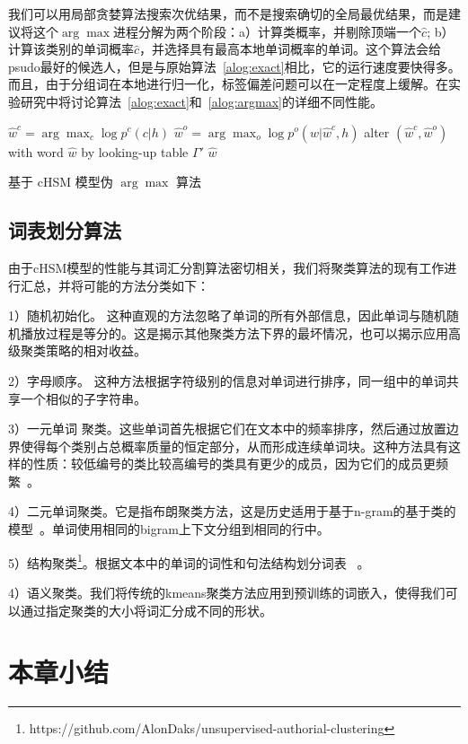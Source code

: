 我们可以用局部贪婪算法搜索次优结果，而不是搜索确切的全局最优结果，而是建议将这个$ \arg\max $进程分解为两个阶段：a）计算类概率，并剔除顶端一个$ \hat c $; b）计算该类别的单词概率$ \hat c $，并选择具有最高本地单词概率的单词。这个算法会给psudo最好的候选人，但是与原始算法~\ref{alog:exact}相比，它的运行速度要快得多。而且，由于分组词在本地进行归一化，标签偏差问题可以在一定程度上缓解。在实验研究中将讨论算法~\ref{alog:exact}和~\ref{alog:argmax}的详细不同性能。
\begin{algorithm}[!ht]
 $\hat w^c=\arg\max_c{\log p^c(c|h)}$ 
 $\hat w^o=\arg\max_o{\log p^o(w|\hat w^c,h)}$
 alter $(\hat w^c,\hat w^o)$ with word $\hat w$ by looking-up table $\Gamma'$ \;
 \Return $\hat w$
 \caption{基于 cHSM 模型伪 $\arg\max$ 算法}\label{alog:argmax}
\end{algorithm}

\subsection{词表划分算法}
由于cHSM模型的性能与其词汇分割算法密切相关，我们将聚类算法的现有工作进行汇总，并将可能的方法分类如下：

1）随机初始化。 这种直观的方法忽略了单词的所有外部信息，因此单词与随机随机播放过程是等分的。这是揭示其他聚类方法下界的最坏情况，也可以揭示应用高级聚类策略的相对收益。

2）字母顺序。 这种方法根据字符级别的信息对单词进行排序，同一组中的单词共享一个相似的子字符串。

3）一元单词 聚类。这些单词首先根据它们在文本中的频率排序，然后通过放置边界使得每个类别占总概率质量的恒定部分，从而形成连续单词块。这种方法具有这样的性质：较低编号的类比较高编号的类具有更少的成员，因为它们的成员更频繁~。

4）二元单词聚类。它是指布朗聚类方法，这是历史适用于基于n-gram的基于类的模型~。单词使用相同的bigram上下文分组到相同的行中。

5）结构聚类\footnote{https://github.com/AlonDaks/unsupervised-authorial-clustering}。根据文本中的单词的词性和句法结构划分词表~ 。

4）语义聚类。我们将传统的kmeans聚类方法应用到预训练的词嵌入，使得我们可以通过指定聚类的大小将词汇分成不同的形状。
\section{本章小结}